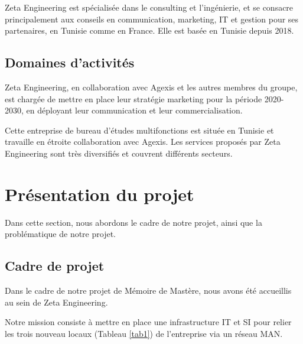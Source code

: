 Zeta Engineering est spécialisée dans le consulting et l'ingénierie, et se consacre principalement aux conseils en communication, marketing, IT et gestion pour ses partenaires, en Tunisie comme en France. Elle est basée en Tunisie depuis 2018.

\subsection{Domaines d'activités}
Zeta Engineering, en collaboration avec Agexis et les autres membres du groupe, est chargée de mettre en place leur stratégie marketing pour la période 2020-2030, en déployant leur communication et leur commercialisation.

Cette entreprise de bureau d'études multifonctions est située en Tunisie et travaille en étroite collaboration avec Agexis. Les services proposés par Zeta Engineering sont très diversifiés et couvrent différents secteurs.
\section{Présentation du projet}

Dans cette section, nous abordons le cadre de notre projet, ainsi que la problématique de notre projet.

\subsection{Cadre de projet}
Dans le cadre de notre projet de Mémoire de Mastère, nous avons été accueillis au sein de Zeta Engineering. 

Notre mission consiste à mettre en place une infrastructure IT et SI pour relier les trois nouveau locaux (Tableau \ref{tab1}) de l'entreprise via un réseau MAN.\\



